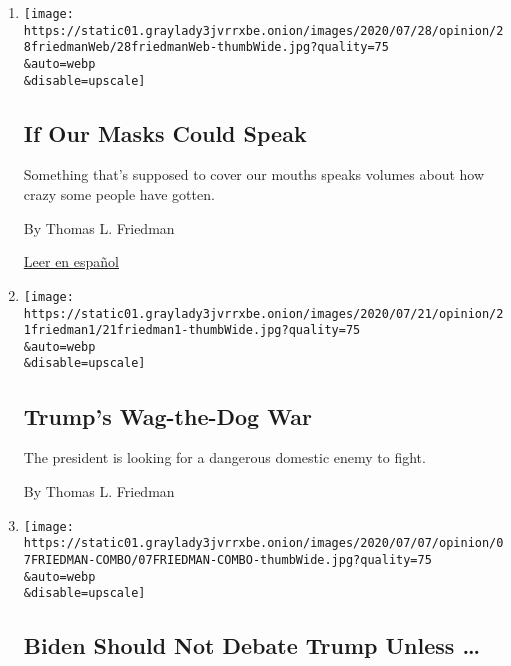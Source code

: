 \begin{enumerate}
\def\labelenumi{\arabic{enumi}.}
\item
  \href{/2020/07/28/opinion/coronavirus-masks.html}{}

  \texttt{[image: https://static01.graylady3jvrrxbe.onion/images/2020/07/28/opinion/28friedmanWeb/28friedmanWeb-thumbWide.jpg?quality=75\\\&auto=webp\\\&disable=upscale]}

  \hypertarget{if-our-masks-could-speak}{%
  \subsection{If Our Masks Could Speak}\label{if-our-masks-could-speak}}

  Something that's supposed to cover our mouths speaks volumes about how
  crazy some people have gotten.

  By Thomas L. Friedman

  \href{https://www.nytimes3xbfgragh.onion/es/2020/07/30/espanol/opinion/usar-cubrebocas-politica.html}{Leer
  en español}
\item
  \href{/2020/07/21/opinion/trump-portland-syria.html}{}

  \texttt{[image: https://static01.graylady3jvrrxbe.onion/images/2020/07/21/opinion/21friedman1/21friedman1-thumbWide.jpg?quality=75\\\&auto=webp\\\&disable=upscale]}

  \hypertarget{trumps-wag-the-dog-war}{%
  \subsection{Trump's Wag-the-Dog War}\label{trumps-wag-the-dog-war}}

  The president is looking for a dangerous domestic enemy to fight.

  By Thomas L. Friedman
\item
  \href{/2020/07/07/opinion/biden-trump-debate.html}{}

  \texttt{[image: https://static01.graylady3jvrrxbe.onion/images/2020/07/07/opinion/07FRIEDMAN-COMBO/07FRIEDMAN-COMBO-thumbWide.jpg?quality=75\\\&auto=webp\\\&disable=upscale]}

  \hypertarget{biden-should-not-debate-trump-unless-}{%
  \subsection{Biden Should Not Debate Trump Unless
  \ldots{}}\label{biden-should-not-debate-trump-unless-}}


\end{enumerate}
